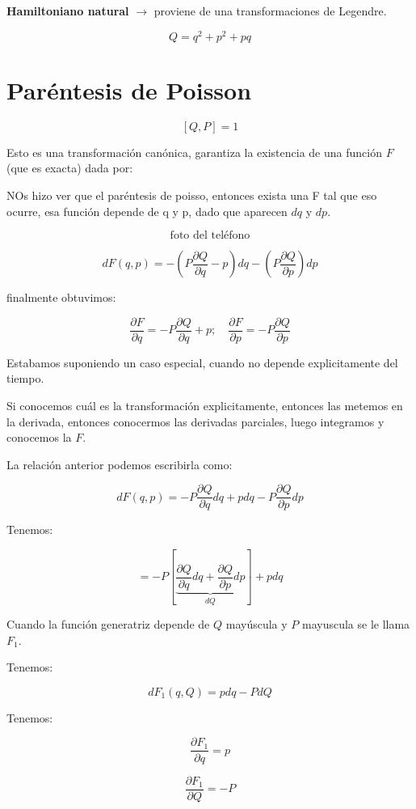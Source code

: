 \documentclass{article}
\begin{document}
\textbf{Hamiltoniano natural} $\to$ proviene de una transformaciones de Legendre. 

\[  Q = q^{2}+p^{2}+pq \]

\section{Paréntesis de Poisson}

\[ [Q,P] = 1 \]

Esto es una transformación canónica, garantiza la existencia de una función $F$ (que es exacta) dada por:

NOs hizo ver que el paréntesis de poisso, entonces exista una F tal que eso ocurre, esa función depende de q y p, dado que aparecen $dq$ y $dp$. 

\[ \text{foto del teléfono} \]

\[ dF(q,p) = - \left( P \frac{\partial Q}{\partial q}  -p \right) dq - \left( P \frac{\partial Q}{\partial p}\right) dp  \]


finalmente obtuvimos:


\[  \frac{\partial F}{\partial q} = -P \frac{\partial Q}{\partial q}+p; \quad \frac{\partial F}{\partial p} = - P\frac{\partial Q}{\partial p}  \]

Estabamos suponiendo un caso especial, cuando no depende explicitamente del tiempo.


Si conocemos cuál es la transformación explicitamente, entonces las metemos en la derivada, entonces conocermos las derivadas parciales, luego integramos y conocemos la $F$. 

La relación anterior podemos escribirla como:


\[dF(q,p) = -P \frac{\partial Q}{\partial q}dq + pdq -P \frac{\partial Q}{\partial p}dp\]


Tenemos:


\[  = -P \left[  \underbrace{\frac{\partial Q}{\partial q}dq + \frac{\partial Q}{\partial p}dp}_{dQ}  \right] +pdq  \]


Cuando la función generatriz depende de $Q$ mayúscula y $P$ mayuscula se le llama $F_{1}$.

Tenemos:


\[ dF_{1} (q,Q) = pdq - PdQ  \]


Tenemos:


\[ \boxed{ \frac{\partial F_{1}}{\partial q} } = p \]


\[ \boxed{  \frac{\partial F_{1}  }{\partial Q}  } = -P  \]
\end{document}
